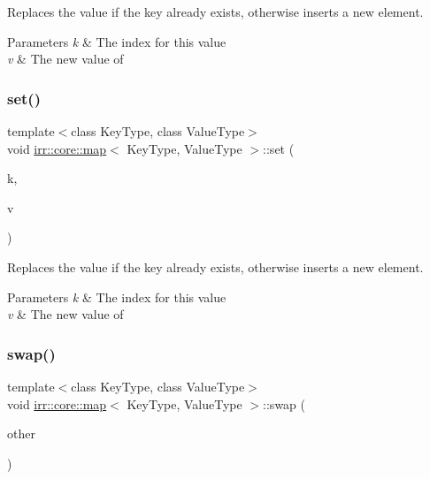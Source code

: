 Replaces the value if the key already exists, otherwise inserts a new element. 


\begin{DoxyParams}{Parameters}
{\em k} & The index for this value \\
\hline
{\em v} & The new value of \\
\hline
\end{DoxyParams}
\mbox{\label{classirr_1_1core_1_1map_ae31213e9478dd259bdd79c7fd3249584}} 
\subsubsection{\texorpdfstring{set()}{set()}\hspace{0.1cm}{\footnotesize\ttfamily [2/2]}}
{\footnotesize\ttfamily template$<$class Key\+Type, class Value\+Type$>$ \\
void \hyperlink{classirr_1_1core_1_1map}{irr\+::core\+::map}$<$ Key\+Type, Value\+Type $>$\+::set (\begin{DoxyParamCaption}\item[{const Key\+Type \&}]{k,  }\item[{const Value\+Type \&}]{v }\end{DoxyParamCaption})\hspace{0.3cm}{\ttfamily [inline]}}



Replaces the value if the key already exists, otherwise inserts a new element. 


\begin{DoxyParams}{Parameters}
{\em k} & The index for this value \\
\hline
{\em v} & The new value of \\
\hline
\end{DoxyParams}
\mbox{\label{classirr_1_1core_1_1map_a411cde5df191c16616e20eb7027b9a20}} 
\subsubsection{\texorpdfstring{swap()}{swap()}\hspace{0.1cm}{\footnotesize\ttfamily [1/2]}}
{\footnotesize\ttfamily template$<$class Key\+Type, class Value\+Type$>$ \\
void \hyperlink{classirr_1_1core_1_1map}{irr\+::core\+::map}$<$ Key\+Type, Value\+Type $>$\+::swap (\begin{DoxyParamCaption}\item[{\hyperlink{classirr_1_1core_1_1map}{map}$<$ Key\+Type, Value\+Type $>$ \&}]{other }\end{DoxyParamCaption})\hspace{0.3cm}{\ttfamily [inline]}}




